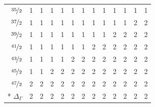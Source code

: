 \documentclass[10pt,a4paper]{article}
\makeatletter
\def\grouprule#1#2{\noalign{\marks\LTgroupmarks{\the\belowrulesep}\nobreak\vskip#1%
  \vskip\aboverulesep}\multispan\LT@cols\unskip{\leaders\hrule\@height#2\hfill\kern\z@}\cr
  \noalign{\penalty\LTrulebreak\vskip\belowrulesep\global\@lastruleclass\z@}}
\numberwithin{equation}{section}
\makeatother
\begin{document}
{\begin{longtable}{@{}rrrrrrrrrrrrr@{}}
$\nicefrac{35}{2}$ & 1 & 1 & 1 & 1 & 1 & 1 & 1 & 1 & 1 & 1 & 1 & 1\\
$\nicefrac{37}{2}$ & 1 & 1 & 1 & 1 & 1 & 1 & 1 & 1 & 1 & 1 & 2 & 2\\
$\nicefrac{39}{2}$ & 1 & 1 & 1 & 1 & 1 & 1 & 1 & 1 & 2 & 2 & 2 & 2\\
$\nicefrac{41}{2}$ & 1 & 1 & 1 & 1 & 1 & 1 & 2 & 2 & 2 & 2 & 2 & 2\\
$\nicefrac{43}{2}$ & 1 & 1 & 1 & 1 & 2 & 2 & 2 & 2 & 2 & 2 & 2 & 2\\
$\nicefrac{45}{2}$ & 1 & 1 & 2 & 2 & 2 & 2 & 2 & 2 & 2 & 2 & 2 & 2\\
$\nicefrac{47}{2}$ & 2 & 2 & 2 & 2 & 2 & 2 & 2 & 2 & 2 & 2 & 2 & 2\\*
\grouprule{0pt}{\lightrulewidth} $\Delta_\Gamma$ & 2 & 2 & 2 & 2 & 2 & 2 & 2 & 2 & 2 & 2 & 2 & 2\\
\bottomrule\end{longtable}}
\end{document}
